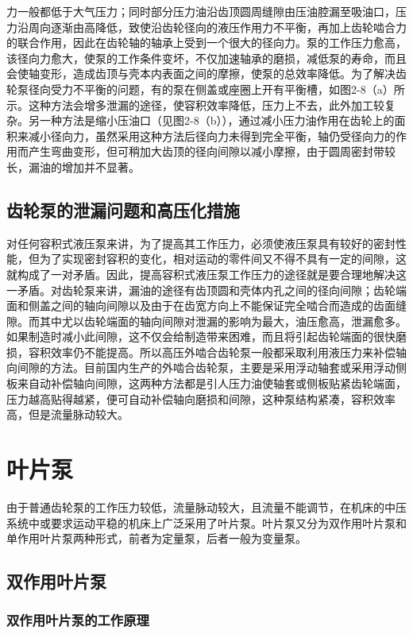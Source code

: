 力一般都低于大气压力；同时部分压力油沿齿顶圆周缝隙由压油腔漏至吸油口，压力沿周向逐渐由高降低，致使沿齿轮径向的液压作用力不平衡，再加上齿轮啮合力的联合作用，因此在齿轮轴的轴承上受到一个很大的径向力。泵的工作压力愈高，该径向力愈大，使泵的工作条件变坏，不仅加速轴承的磨损，减低泵的寿命，而且会使轴变形，造成齿顶与壳本内表面之间的摩擦，使泵的总效率降低。为了解决齿轮泵径向受力不平衡的问题，有的泵在侧盖或座圈上开有平衡槽，如图2-8（a）所示。这种方法会增多泄漏的途径，使容积效率降低，压力上不去，此外加工较复杂。另一种方法是缩小压油口（见图2-8（b）），通过减小压力油作用在齿轮上的面积来减小径向力，虽然采用这种方法后径向力未得到完全平衡，轴仍受径向力的作用而产生弯曲变形，但可稍加大齿顶的径向间隙以减小摩擦，由于圆周密封带较长，漏油的增加并不显著。

\subsection{齿轮泵的泄漏问题和高压化措施}

对任何容积式液压泵来讲，为了提高其工作压力，必须使液压泵具有较好的密封性能，但为了实现密封容积的变化，相对运动的零件间又不得不具有一定的间隙，这就构成了一对矛盾。因此，提高容积式液压泵工作压力的途径就是要合理地解决这一矛盾。对齿轮泵来讲，漏油的途径有齿顶圆和壳体内孔之间的径向间隙；齿轮端面和侧盖之间的轴向间隙以及由于在齿宽方向上不能保证完全啮合而造成的齿面缝隙。而其中尤以齿轮端面的轴向间隙对泄漏的影响为最大，油压愈高，泄漏愈多。如果制造时减小此间隙，这不仅会给制造带来困难，而且将引起齿轮端面的很快磨损，容积效率仍不能提高。所以高压外啮合齿轮泵一般都采取利用液压力来补偿轴向间隙的方法。目前国内生产的外啮合齿轮泵，主要是采用浮动轴套或采用浮动侧板来自动补偿轴向间隙，这两种方法都是引人压力油使轴套或侧板贴紧齿轮端面，压力越高贴得越紧，便可自动补偿轴向磨损和间隙，这种泵结构紧凑，容积效率高，但是流量脉动较大。

\section{叶片泵}

由于普通齿轮泵的工作压力较低，流量脉动较大，且流量不能调节，在机床的中压系统中或要求运动平稳的机床上广泛采用了叶片泵。叶片泵又分为双作用叶片泵和单作用叶片泵两种形式，前者为定量泵，后者一般为变量泵。

\subsection{双作用叶片泵}

\subsubsection{双作用叶片泵的工作原理}

